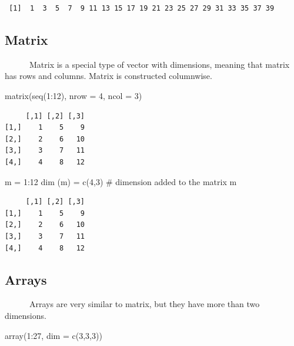 \documentclass[
  letterpaper,
  DIV=11,
  numbers=noendperiod]{scrreprt}
\newenvironment{Shaded}{\begin{snugshade}}{\end{snugshade}}
\newcommand{\AttributeTok}[1]{\textcolor[rgb]{0.40,0.45,0.13}{#1}}
\newcommand{\CommentTok}[1]{\textcolor[rgb]{0.37,0.37,0.37}{#1}}
\newcommand{\DecValTok}[1]{\textcolor[rgb]{0.68,0.00,0.00}{#1}}
\newcommand{\FunctionTok}[1]{\textcolor[rgb]{0.28,0.35,0.67}{#1}}
\newcommand{\NormalTok}[1]{\textcolor[rgb]{0.00,0.23,0.31}{#1}}
\newcommand{\OtherTok}[1]{\textcolor[rgb]{0.00,0.23,0.31}{#1}}
\newcommand{\SpecialCharTok}[1]{\textcolor[rgb]{0.37,0.37,0.37}{#1}}
\begin{document}
\begin{verbatim}
 [1]  1  3  5  7  9 11 13 15 17 19 21 23 25 27 29 31 33 35 37 39
\end{verbatim}

\subsection{Matrix}\label{matrix}

~~~~~~Matrix is a special type of vector with dimensions, meaning that
matrix has rows and columns. Matrix is constructed columnwise.

\begin{Shaded}
\begin{Highlighting}[]
\FunctionTok{matrix}\NormalTok{(}\FunctionTok{seq}\NormalTok{(}\DecValTok{1}\SpecialCharTok{:}\DecValTok{12}\NormalTok{), }\AttributeTok{nrow =} \DecValTok{4}\NormalTok{, }\AttributeTok{ncol =} \DecValTok{3}\NormalTok{)}
\end{Highlighting}
\end{Shaded}

\begin{verbatim}
     [,1] [,2] [,3]
[1,]    1    5    9
[2,]    2    6   10
[3,]    3    7   11
[4,]    4    8   12
\end{verbatim}

\begin{Shaded}
\begin{Highlighting}[]
\NormalTok{m }\OtherTok{=} \DecValTok{1}\SpecialCharTok{:}\DecValTok{12}
\FunctionTok{dim}\NormalTok{ (m) }\OtherTok{=} \FunctionTok{c}\NormalTok{(}\DecValTok{4}\NormalTok{,}\DecValTok{3}\NormalTok{) }\CommentTok{\# dimension added to the matrix }
\NormalTok{m}
\end{Highlighting}
\end{Shaded}

\begin{verbatim}
     [,1] [,2] [,3]
[1,]    1    5    9
[2,]    2    6   10
[3,]    3    7   11
[4,]    4    8   12
\end{verbatim}

\subsection{Arrays}\label{arrays}

~~~~~~Arrays are very similar to matrix, but they have more than two
dimensions.

\begin{Shaded}
\begin{Highlighting}[]
\FunctionTok{array}\NormalTok{(}\DecValTok{1}\SpecialCharTok{:}\DecValTok{27}\NormalTok{, }\AttributeTok{dim =} \FunctionTok{c}\NormalTok{(}\DecValTok{3}\NormalTok{,}\DecValTok{3}\NormalTok{,}\DecValTok{3}\NormalTok{))}
\end{Highlighting}
\end{Shaded}
\end{document}
